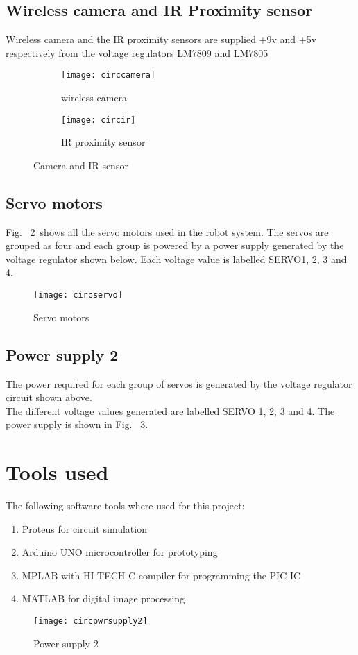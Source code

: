 \documentclass{report}
\begin{document}
\subsection{Wireless camera and IR Proximity sensor}
Wireless camera and the IR proximity sensors are supplied +9v and +5v respectively from the voltage regulators LM7809 and LM7805\\
\begin{figure}[h!]
\begin{subfigure}{0.5\textwidth}
	\centering
	\texttt{[image: circcamera]}
	\caption{wireless camera}
\end{subfigure}

\begin{subfigure}{0.5\textwidth}
	\centering
	\texttt{[image: circir]}
	\caption{IR proximity sensor}
\end{subfigure}%
\caption{Camera and IR sensor}
\label{fig212}
\end{figure}
\subsection{Servo motors}
Fig. ~\ref{fig213}\ shows all the servo motors used in the robot system. The servos are grouped as four and each group is powered by a power supply generated by the voltage regulator shown below. Each voltage value is labelled SERVO1, 2, 3 and 4.\\
\begin{figure}[h!]
\centering
\texttt{[image: circservo]}
\caption{Servo motors}
\label{fig213}
\end{figure}
\FloatBarrier

\subsection{Power supply 2}
The power required for each group of servos is generated by the voltage regulator circuit shown above.\\
The different voltage values generated are labelled SERVO 1, 2, 3 and 4. The power supply is shown in Fig. ~\ref{fig214}.
\section{Tools used}
The following software tools where used for this project:
\begin{enumerate}
\item	Proteus for circuit simulation
\item	Arduino UNO microcontroller for prototyping
\item	MPLAB with HI-TECH C compiler for programming the PIC IC
\item	MATLAB  for digital image processing
\end{enumerate}
\begin{figure}[h!]
\centering
\texttt{[image: circpwrsupply2]}
\caption{Power supply 2}
\label{fig214}
\end{figure}
\end{document}
